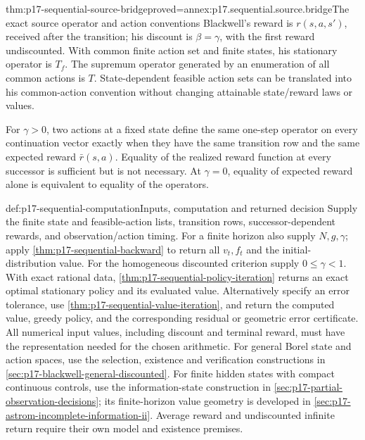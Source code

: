 \begin{hblemma}{thm:p17-sequential-source-bridge}{proved=annex:p17.sequential.source.bridge}{The exact source operator and action conventions}
Blackwell's reward is \(r(s,a,s')\), received after the
transition; his discount is \(\beta=\gamma\), with the
first reward undiscounted. With common finite action set
and finite states, his stationary operator is \(T_f\).
The supremum operator generated by an enumeration of all
common actions is \(T\).
State-dependent feasible action sets can be translated into
his common-action convention without changing attainable
state/reward laws or values.

For \(\gamma>0\), two actions at a fixed state define the
same one-step operator on every continuation vector exactly
when they have the same transition row and the same
expected reward \(\bar r(s,a)\). Equality of the realized
reward function at every successor is sufficient but is not
necessary. At \(\gamma=0\), equality of expected reward
alone is equivalent to equality of the operators.
\end{hblemma}

\begin{hbmethod}{def:p17-sequential-computation}{Inputs, computation and returned decision}
Supply the finite state and feasible-action lists, transition rows,
successor-dependent rewards, and observation/action timing.
For a finite horizon also supply \(N,g,\gamma\); apply
\cref{thm:p17-sequential-backward} to return all \(v_t,f_t\)
and the initial-distribution value.
For the homogeneous discounted criterion supply \(0\leq\gamma<1\).
With exact rational data, \cref{thm:p17-sequential-policy-iteration}
returns an exact optimal stationary policy and its evaluated value.
Alternatively specify an error tolerance, use
\cref{thm:p17-sequential-value-iteration}, and return the
computed value, greedy policy, and the corresponding residual
or geometric error certificate.
All numerical input values, including discount and terminal reward,
must have the representation needed for the chosen arithmetic.
For general Borel state and action spaces, use the selection,
existence and verification constructions in
\cref{sec:p17-blackwell-general-discounted}.
For finite hidden states with compact continuous controls, use the
information-state construction in
\cref{sec:p17-partial-observation-decisions}; its finite-horizon
value geometry is developed in
\cref{sec:p17-astrom-incomplete-information-ii}.
Average reward and undiscounted infinite return require their own
model and existence premises.
\end{hbmethod}
